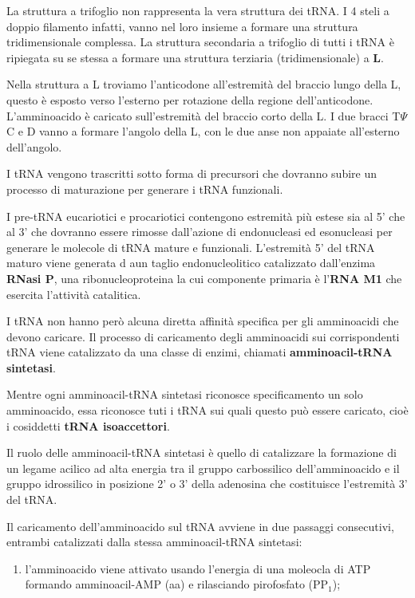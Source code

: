 \documentclass[]{article}
\begin{document}
La struttura a trifoglio non rappresenta la vera struttura dei tRNA. I 4
steli a doppio filamento infatti, vanno nel loro insieme a formare una
struttura tridimensionale complessa. La struttura secondaria a trifoglio
di tutti i tRNA è ripiegata su se stessa a formare una struttura
terziaria (tridimensionale) a \textbf{L}.

Nella struttura a L troviamo l'anticodone all'estremità del braccio
lungo della L, questo è esposto verso l'esterno per rotazione della
regione dell'anticodone. L'amminoacido è caricato sull'estremità del
braccio corto della L. I due bracci T\(\Psi\)C e D vanno a formare
l'angolo della L, con le due anse non appaiate all'esterno dell'angolo.

I tRNA vengono trascritti sotto forma di precursori che dovranno subire
un processo di maturazione per generare i tRNA funzionali.

I pre-tRNA eucariotici e procariotici contengono estremità più estese
sia al 5' che al 3' che dovranno essere rimosse dall'azione di
endonucleasi ed esonucleasi per generare le molecole di tRNA mature e
funzionali. L'estremità 5' del tRNA maturo viene generata d aun taglio
endonucleolitico catalizzato dall'enzima \textbf{RNasi P}, una
ribonucleoproteina la cui componente primaria è l'\textbf{RNA M1} che
esercita l'attività catalitica.

I tRNA non hanno però alcuna diretta affinità specifica per gli
amminoacidi che devono caricare. Il processo di caricamento degli
amminoacidi sui corrispondenti tRNA viene catalizzato da una classe di
enzimi, chiamati \textbf{amminoacil-tRNA sintetasi}.

Mentre ogni amminoacil-tRNA sintetasi riconosce specificamento un solo
amminoacido, essa riconosce tuti i tRNA sui quali questo può essere
caricato, cioè i cosiddetti \textbf{tRNA isoaccettori}.

Il ruolo delle amminoacil-tRNA sintetasi è quello di catalizzare la
formazione di un legame acilico ad alta energia tra il gruppo
carbossilico dell'amminoacido e il gruppo idrossilico in posizione 2' o
3' della adenosina che costituisce l'estremità 3' del tRNA.

Il caricamento dell'amminoacido sul tRNA avviene in due passaggi
consecutivi, entrambi catalizzati dalla stessa amminoacil-tRNA
sintetasi:

\begin{enumerate}
\def\labelenumi{\arabic{enumi}.}
\itemsep1pt\parskip0pt
\item
  l'amminoacido viene attivato usando l'energia di una moleocla di ATP
  formando amminoacil-AMP (aa) e rilasciando pirofosfato (PP\(_1\));
\end{enumerate}
\end{document}
